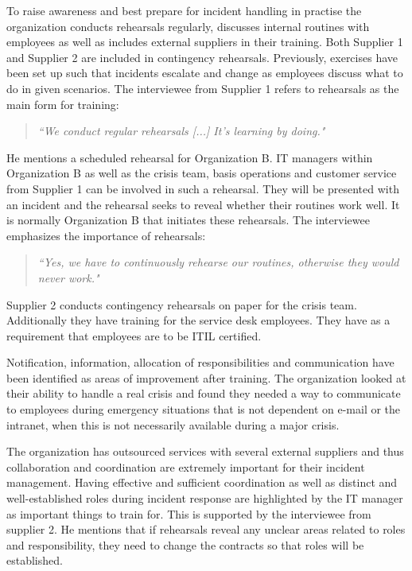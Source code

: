 To raise awareness and best prepare for incident handling in practise the organization conducts rehearsals regularly, discusses internal routines with employees as well as includes external suppliers in their training. Both Supplier 1 and Supplier 2 are included in contingency rehearsals. Previously, exercises have been set up such that incidents escalate and change as employees discuss what to do in given scenarios. The interviewee from Supplier 1 refers to rehearsals as the main form for training:

\begin{quote}
\textit{``We conduct regular rehearsals [...] It's learning by doing."}
\end{quote}

He mentions a scheduled rehearsal for Organization B. IT managers within Organization B as well as the crisis team, basis operations and customer service from Supplier 1 can be involved in such a rehearsal. They will be presented with an incident and the rehearsal seeks to reveal whether their routines work well. It is normally Organization B that initiates these rehearsals. The interviewee emphasizes the importance of rehearsals:

\begin{quote}
\textit{``Yes, we have to continuously rehearse our routines, otherwise they would never work."}
\end{quote}

Supplier 2 conducts contingency rehearsals on paper for the crisis team. Additionally they have training for the service desk employees. They have as a requirement that employees are to be \ac{ITIL} certified.

Notification, information, %
allocation of responsibilities and communication have been identified as areas of improvement after training. The organization looked at their ability to handle a real crisis and found they needed a way to communicate to employees during emergency situations that is not dependent on e-mail or the intranet, when this is not necessarily available during a major crisis.

The organization has outsourced services with several external suppliers and thus collaboration and coordination are extremely important for their incident management. Having effective and sufficient coordination as well as distinct and well-established roles during incident response are highlighted by the IT manager as important things to train for. This is supported by the interviewee from supplier 2. He mentions that if rehearsals reveal any unclear areas related to roles and responsibility, they need to change the contracts so that roles will be established.

